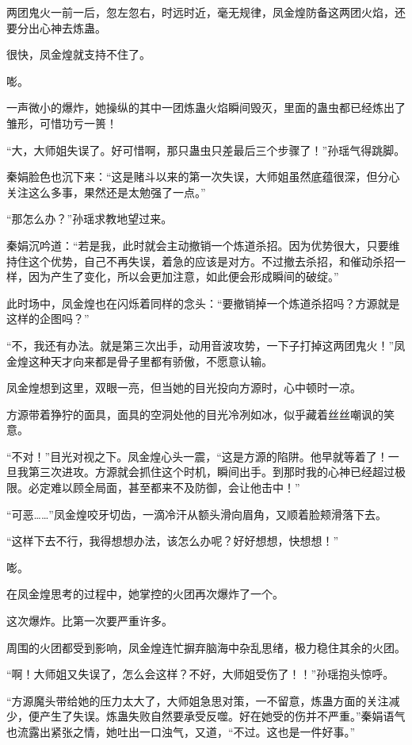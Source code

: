 
\begin{this_body}

两团鬼火一前一后，忽左忽右，时远时近，毫无规律，凤金煌防备这两团火焰，还要分出心神去炼蛊。

很快，凤金煌就支持不住了。

嘭。

一声微小的爆炸，她操纵的其中一团炼蛊火焰瞬间毁灭，里面的蛊虫都已经炼出了雏形，可惜功亏一篑！

“大，大师姐失误了。好可惜啊，那只蛊虫只差最后三个步骤了！”孙瑶气得跳脚。

秦娟脸色也沉下来：“这是赌斗以来的第一次失误，大师姐虽然底蕴很深，但分心关注这么多事，果然还是太勉强了一点。”

“那怎么办？”孙瑶求教地望过来。

秦娟沉吟道：“若是我，此时就会主动撤销一个炼道杀招。因为优势很大，只要维持住这个优势，自己不再失误，着急的应该是对方。不过撤去杀招，和催动杀招一样，因为产生了变化，所以会更加注意，如此便会形成瞬间的破绽。”

此时场中，凤金煌也在闪烁着同样的念头：“要撤销掉一个炼道杀招吗？方源就是这样的企图吗？”

“不，我还有办法。就是第三次出手，动用音波攻势，一下子打掉这两团鬼火！”凤金煌这种天才向来都是骨子里都有骄傲，不愿意认输。

凤金煌想到这里，双眼一亮，但当她的目光投向方源时，心中顿时一凉。

方源带着狰狞的面具，面具的空洞处他的目光冷冽如冰，似乎藏着丝丝嘲讽的笑意。

“不对！”目光对视之下。凤金煌心头一震，“这是方源的陷阱。他早就等着了！一旦我第三次进攻。方源就会抓住这个时机，瞬间出手。到那时我的心神已经超过极限。必定难以顾全局面，甚至都来不及防御，会让他击中！”

“可恶……”凤金煌咬牙切齿，一滴冷汗从额头滑向眉角，又顺着脸颊滑落下去。

“这样下去不行，我得想想办法，该怎么办呢？好好想想，快想想！”

嘭。

在凤金煌思考的过程中，她掌控的火团再次爆炸了一个。

这次爆炸。比第一次要严重许多。

周围的火团都受到影响，凤金煌连忙摒弃脑海中杂乱思绪，极力稳住其余的火团。

“啊！大师姐又失误了，怎么会这样？不好，大师姐受伤了！！”孙瑶抱头惊呼。

“方源魔头带给她的压力太大了，大师姐急思对策，一不留意，炼蛊方面的关注减少，便产生了失误。炼蛊失败自然要承受反噬。好在她受的伤并不严重。”秦娟语气也流露出紧张之情，她吐出一口浊气，又道，“不过。这也是一件好事。”


\end{this_body}
